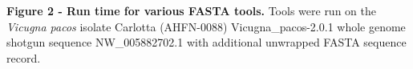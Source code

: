 \textbf{Figure 2 - Run time for various FASTA tools.} Tools were run on the \textit{Vicugna pacos} isolate Carlotta (AHFN-0088) Vicugna\_pacos-2.0.1 whole genome shotgun sequence NW\_005882702.1 with additional unwrapped FASTA sequence record.
  
  
  
  